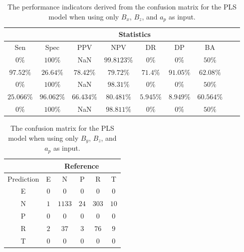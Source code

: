 \begin{table}[!ht]
	\centering
	\begin{tabular}{|c|c|c|c|c|c|c|c|c|}
		\hline
		 & \multicolumn{7}{c|}{Statistics} \\ \hline
		Sen & Spec & PPV & NPV & DR & DP & BA \\ \hline
		$0\%$ & $100\%$ & NaN & $99.8123\%$ & $0\%$ & $0\%$ & $50\%$ \\ \hline
		$97.52\%$ & $26.64\%$ & $78.42\%$ & $79.72\%$ & $71.4\%$ & $91.05\%$ & $62.08\%$ \\ \hline
		$0\%$ & $100\%$ & NaN & $98.31\%$ & $0\%$ & $0\%$ & $50\%$ \\ \hline
		$25.066\%$ & $96.062\%$ & $66.434\%$ & $80.481\%$ & $5.945\%$ & $8.949\%$ & $60.564\%$ \\ \hline
		$0\%$ & $100\%$ & NaN & $98.811\%$ & $0\%$ & $0\%$ & $50\%$ \\ \hline
	\end{tabular}
	\caption{The performance indicators derived from the confusion matrix for the PLS model when using only $B_{x}$, $B_{z}$, and $a_{p}$ as input.}
	\label{tab:cs:xzap:pls}
\end{table}

\begin{table}[!ht]
	\centering
	\begin{tabular}{|c|c|c|c|c|c|}
		\hline
		 & \multicolumn{5}{|c|}{Reference} \\ \hline
		 Prediction & E & N & P & R & T \\ \hline
		 E & $0$ & $0$ & $0$ & $0$ & $0$ \\ \hline
		 N & $1$ & $1133$ & $24$ & $303$ & $10$ \\ \hline
		 P & $0$ & $0$ & $0$ & $0$ & $0$ \\ \hline
		 R & $2$ & $37$ & $3$ & $76$ & $9$ \\ \hline
		 T & $0$ & $0$ & $0$ & $0$ & $0$ \\ \hline
	\end{tabular}
	\caption{The confusion matrix for the PLS model when using only $B_{y}$, $B_{z}$, and $a_{p}$ as input.}
	\label{tab:cm:yzap:pls}
\end{table}

